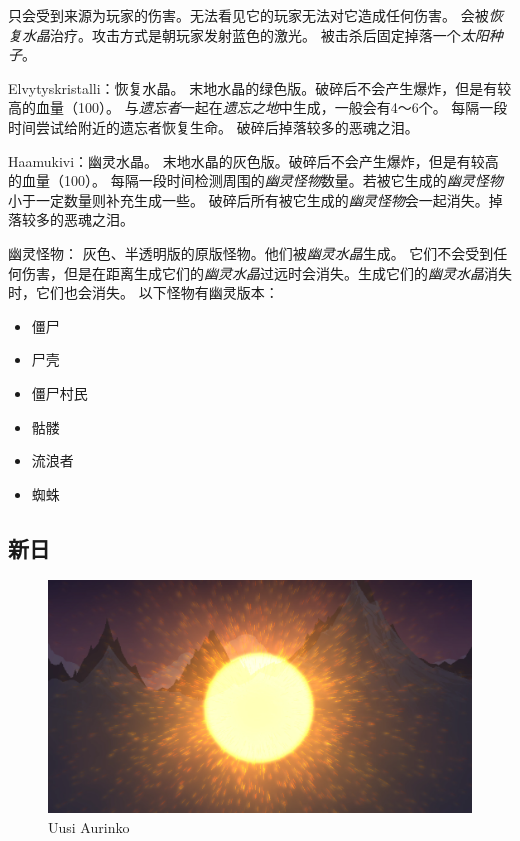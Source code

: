 \documentclass[11pt]{article}
\begin{document}
    只会受到来源为玩家的伤害。无法看见它的玩家无法对它造成任何伤害。
    会被\textit{恢复水晶}治疗。攻击方式是朝玩家发射蓝色的激光。
    被击杀后固定掉落一个\textit{太阳种子}。

    Elvytyskristalli：恢复水晶。
    末地水晶的绿色版。破碎后不会产生爆炸，但是有较高的血量（100）。
    与\textit{遗忘者}一起在\textit{遗忘之地}中生成，一般会有4～6个。
    每隔一段时间尝试给附近的遗忘者恢复生命。
    破碎后掉落较多的恶魂之泪。

    Haamukivi：幽灵水晶。
    末地水晶的灰色版。破碎后不会产生爆炸，但是有较高的血量（100）。
    每隔一段时间检测周围的\textit{幽灵怪物}数量。若被它生成的\textit{幽灵怪物}小于一定数量则补充生成一些。
    破碎后所有被它生成的\textit{幽灵怪物}会一起消失。掉落较多的恶魂之泪。

    幽灵怪物：
    灰色、半透明版的原版怪物。他们被\textit{幽灵水晶}生成。
    它们不会受到任何伤害，但是在距离生成它们的\textit{幽灵水晶}过远时会消失。生成它们的\textit{幽灵水晶}消失时，它们也会消失。
    以下怪物有幽灵版本：
    \begin{itemize}
        \item 僵尸
        \item 尸壳
        \item 僵尸村民
        \item 骷髅
        \item 流浪者
        \item 蜘蛛
    \end{itemize}

    \subsection{新日}\label{subsec:new-sun}
    \begin{figure}[ht]
        \includegraphics[width=\textwidth]{./imgs/New_Sun}
        \caption{Uusi Aurinko}\label{fig:new-sun}
    \end{figure}
\end{document}
